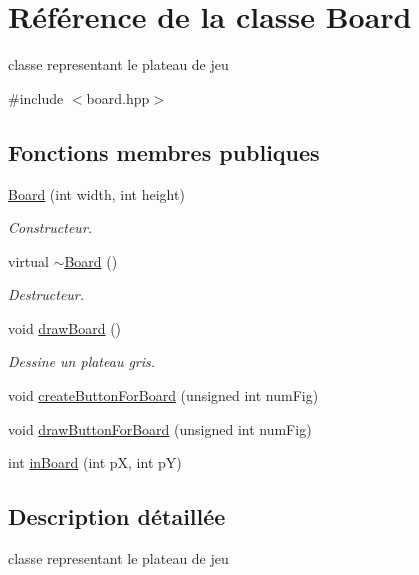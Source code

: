 \hypertarget{class_board}{}\section{Référence de la classe Board}
\label{class_board}


classe representant le plateau de jeu  




{\ttfamily \#include $<$board.\+hpp$>$}

\subsection*{Fonctions membres publiques}
\begin{DoxyCompactItemize}
\item 
\hyperlink{class_board_aaa5fa080b8caf42a9a8309e4fc45a045}{Board} (int width, int height)
\begin{DoxyCompactList}\small\item\em Constructeur. \end{DoxyCompactList}\item 
virtual \hyperlink{class_board_a2fba9e5428840eb48645c078b9f0dcce}{$\sim$\+Board} ()
\begin{DoxyCompactList}\small\item\em Destructeur. \end{DoxyCompactList}\item 
\mbox{\label{class_board_a1845216283a171939dcb477dce3a17b8}} 
void \hyperlink{class_board_a1845216283a171939dcb477dce3a17b8}{draw\+Board} ()
\begin{DoxyCompactList}\small\item\em Dessine un plateau gris. \end{DoxyCompactList}\item 
void \hyperlink{class_board_a2d04e2638eb72204e89a2aab9991a949}{create\+Button\+For\+Board} (unsigned int num\+Fig)
\item 
void \hyperlink{class_board_acf0a6b5036a711d3ef207356f330d830}{draw\+Button\+For\+Board} (unsigned int num\+Fig)
\item 
int \hyperlink{class_board_ac61d62b0969aa0a9f58d280d86bfd011}{in\+Board} (int pX, int pY)
\end{DoxyCompactItemize}


\subsection{Description détaillée}
classe representant le plateau de jeu 


